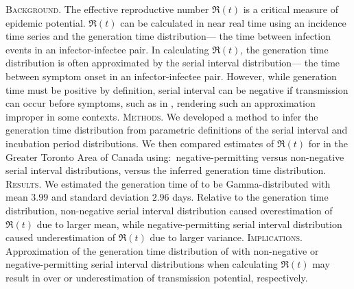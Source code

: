 \textsc{Background}.
The effective reproductive number $\Re(t)$
is a critical measure of epidemic potential.
$\Re(t)$ can be calculated in near real time
using an incidence time series and the generation time distribution---%
the time between infection events in an infector-infectee pair.
In calculating $\Re(t)$, the generation time distribution
is often approximated by the serial interval distribution---%
the time between symptom onset in an infector-infectee pair.
However, while generation time must be positive by definition,
serial interval can be negative if transmission can occur before symptoms,
such as in \covid, rendering such an approximation improper in some contexts.
\textsc{Methods}.
We developed a method to infer the generation time distribution
from parametric definitions of
the serial interval and incubation period distributions.
We then compared estimates of $\Re(t)$ for \covid in
the Greater Toronto Area of Canada using:\
negative-permitting versus non-negative serial interval distributions,
versus the inferred generation time distribution.
\textsc{Results}.
We estimated the generation time of \covid to be
Gamma-distributed with mean $3.99$ and standard deviation $2.96$ days.
Relative to the generation time distribution,
non-negative serial interval distribution caused overestimation of $\Re(t)$
due to larger mean, while
negative-permitting serial interval distribution caused underestimation of $\Re(t)$
due to larger variance.
\textsc{Implications}.
Approximation of the generation time distribution of \covid
with non-negative or negative-permitting serial interval distributions
when calculating $\Re(t)$ may result in over or underestimation of
transmission potential, respectively.